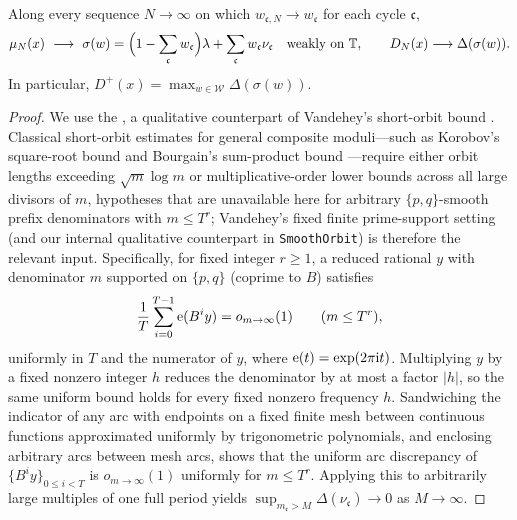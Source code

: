 \documentclass[11pt]{article}
\begin{document}
\begin{theorem}\label{th:mixture}
Along every sequence $N\to\infty$ on which $w_{\mathfrak c,N}\to w_{\mathfrak c}$ for each cycle $\mathfrak c$,
\[
 \mu_N(x)\ \longrightarrow\ \sigma(w)=
     \Bigl(1-\sum_{\mathfrak c} w_{\mathfrak c}\Bigr)\lambda+\sum_{\mathfrak c} w_{\mathfrak c}\nu_{\mathfrak c}
 \quad\text{weakly on }\mathbb T,\qquad
 D_N(x)\longrightarrow\Delta(\sigma(w)).
\]
In particular, $D^+(x)=\max_{w\in\mathcal W}\Delta(\sigma(w))$.
\end{theorem}
\begin{proof}
We use the , a qualitative counterpart of Vandehey's short-orbit bound \cite[Corollary~1.2]{vandehey}. Classical short-orbit estimates for general composite moduli---such as Korobov's square-root bound \cite{korobov70,korobov72} and Bourgain's sum-product bound \cite{bourgain05,bourgain08}---require either orbit lengths exceeding $\sqrt m\log m$ or multiplicative-order lower bounds across all large divisors of $m$, hypotheses that are unavailable here for arbitrary $\{p,q\}$-smooth prefix denominators with $m\le T^r$; Vandehey's fixed finite prime-support setting (and our internal qualitative counterpart in \texttt{SmoothOrbit}) is therefore the relevant input. Specifically, for fixed integer $r\ge1$, a reduced rational $y$ with denominator $m$ supported on $\{p,q\}$ (coprime to $B$) satisfies
\[
 \frac1T\sum_{i=0}^{T-1}\mathrm e(B^i y)=o_{m\to\infty}(1)\qquad (m\le T^r),
\]
uniformly in $T$ and the numerator of $y$, where $\mathrm e(t)=\exp(2\pi\mathrm i t)$. Multiplying $y$ by a fixed nonzero integer $h$ reduces the denominator by at most a factor $|h|$, so the same uniform bound holds for every fixed nonzero frequency $h$. Sandwiching the indicator of any arc with endpoints on a fixed finite mesh between continuous functions approximated uniformly by trigonometric polynomials, and enclosing arbitrary arcs between mesh arcs, shows that the uniform arc discrepancy of $\{B^i y\}_{0\le i<T}$ is $o_{m\to\infty}(1)$ uniformly for $m\le T^r$. Applying this to arbitrarily large multiples of one full period yields $\sup_{m_{\mathfrak c}>M}\Delta(\nu_{\mathfrak c})\to0$ as $M\to\infty$.


\end{proof}
\end{document}
